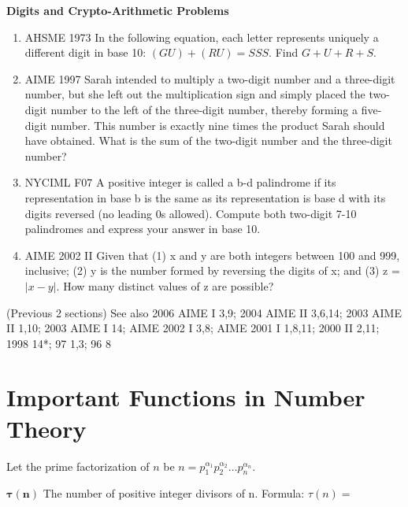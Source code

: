 \documentclass{article}
\begin{document}
\textbf{Digits and Crypto-Arithmetic Problems}
\begin{enumerate}
\item AHSME 1973 In the following equation, each letter represents uniquely a different digit in base 10: $(GU)+(RU)=SSS$. Find $G+U+R+S$.
\item AIME 1997 Sarah intended to multiply a two-digit number and a three-digit number, but she left out the multiplication sign and simply placed the two-digit number to the left of the three-digit number, thereby forming a five-digit number. This number is exactly nine times the product Sarah should have obtained. What is the sum of the two-digit number and the three-digit number?
\item NYCIML F07 A positive integer is called a b-d palindrome if its representation in base b is the same as its representation is base d with its digits reversed (no leading 0s allowed). Compute both two-digit 7-10 palindromes and express your answer in base 10.
\item AIME 2002 II Given that
(1) x and y are both integers between 100 and 999, inclusive;
(2) y is the number formed by reversing the digits of x; and
(3) z = $|x - y|$.
How many distinct values of z are possible?
\end{enumerate}
(Previous 2 sections) See also 2006 AIME I 3,9; 2004 AIME II 3,6,14; 2003 AIME II 1,10; 2003 AIME I 14; AIME 2002 I 3,8; AIME 2001 I 1,8,11; 2000 II 2,11; 1998 14*; 97 1,3; 96 8
\newline

\section{Important Functions in Number Theory}

Let the prime factorization of $n$ be $n=p_1^{\alpha_1}p_2^{\alpha_2}\ldots p_n^{\alpha_n}$.

$\mathbf{\tau (n)}$ The number of positive integer divisors of n.
\newline
Formula: $\tau (n)=$
\newline
\newline
\end{document}
